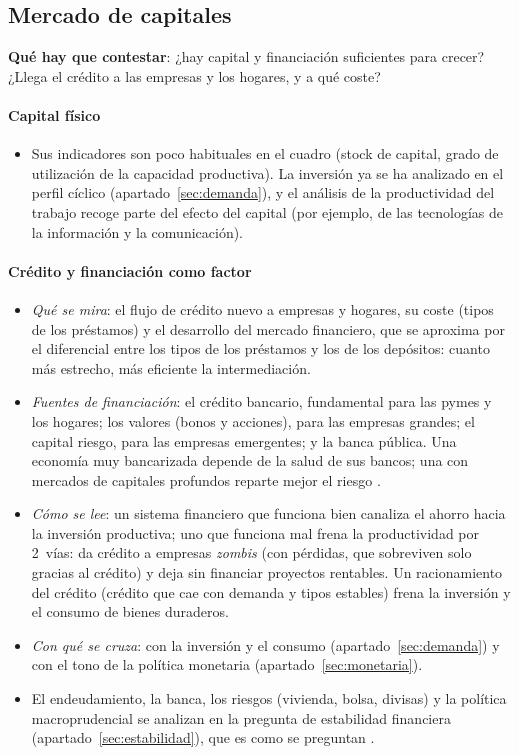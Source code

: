 \documentclass[11pt]{article}
\begin{document}
\subsection{Mercado de capitales}\label{sec:capitales}

\begin{ideaclave}
\textbf{Qué hay que contestar}: ¿hay capital y financiación suficientes para crecer? ¿Llega el crédito a las empresas y los hogares, y a qué coste?
\end{ideaclave}

\paragraph{Capital físico}
\begin{itemize}
\item Sus indicadores son poco habituales en el cuadro (stock de capital, grado de utilización de la capacidad productiva). La inversión ya se ha analizado en el perfil cíclico (apartado~\ref{sec:demanda}), y el análisis de la productividad del trabajo recoge parte del efecto del capital (por ejemplo, de las tecnologías de la información y la comunicación).
\end{itemize}

\paragraph{Crédito y financiación como factor}
\begin{itemize}
\item \emph{Qué se mira}: el flujo de crédito nuevo a empresas y hogares, su coste (tipos de los préstamos) y el desarrollo del mercado financiero, que se aproxima por el diferencial entre los tipos de los préstamos y los de los depósitos: cuanto más estrecho, más eficiente la intermediación.
\item \emph{Fuentes de financiación}: el crédito bancario, fundamental para las pymes y los hogares; los valores (bonos y acciones), para las empresas grandes; el capital riesgo, para las empresas emergentes; y la banca pública. Una economía muy bancarizada depende de la salud de sus bancos; una con mercados de capitales profundos reparte mejor el riesgo \parencite{BCE2026SAFE}.
\item \emph{Cómo se lee}: un sistema financiero que funciona bien canaliza el ahorro hacia la inversión productiva; uno que funciona mal frena la productividad por 2~vías: da crédito a empresas \emph{zombis} (con pérdidas, que sobreviven solo gracias al crédito) y deja sin financiar proyectos rentables. Un racionamiento del crédito (crédito que cae con demanda y tipos estables) frena la inversión y el consumo de bienes duraderos.
\item \emph{Con qué se cruza}: con la inversión y el consumo (apartado~\ref{sec:demanda}) y con el tono de la política monetaria (apartado~\ref{sec:monetaria}).
\item El endeudamiento, la banca, los riesgos (vivienda, bolsa, divisas) y la política macroprudencial se analizan en la pregunta de estabilidad financiera (apartado~\ref{sec:estabilidad}), que es como se preguntan  .
\end{itemize}
\end{document}

